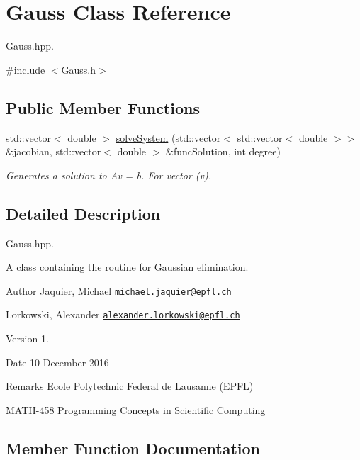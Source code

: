 \hypertarget{class_gauss}{}\section{Gauss Class Reference}
\label{class_gauss}


Gauss.\+hpp.  




{\ttfamily \#include $<$Gauss.\+h$>$}

\subsection*{Public Member Functions}
\begin{DoxyCompactItemize}
\item 
std\+::vector$<$ double $>$ \hyperlink{class_gauss_a47211d56c21c8279ca1349dccb03d77e}{solve\+System} (std\+::vector$<$ std\+::vector$<$ double $>$$>$ \&jacobian, std\+::vector$<$ double $>$ \&func\+Solution, int degree)
\begin{DoxyCompactList}\small\item\em Generates a solution to Av = b. For vector (v). \end{DoxyCompactList}\end{DoxyCompactItemize}


\subsection{Detailed Description}
Gauss.\+hpp. 

A class containing the routine for Gaussian elimination. \begin{DoxyAuthor}{Author}
Jaquier, Michael \href{mailto:michael.jaquier@epfl.ch}{\tt michael.\+jaquier@epfl.\+ch} 

Lorkowski, Alexander \href{mailto:alexander.lorkowski@epfl.ch}{\tt alexander.\+lorkowski@epfl.\+ch} 
\end{DoxyAuthor}
\begin{DoxyVersion}{Version}
1. 
\end{DoxyVersion}
\begin{DoxyDate}{Date}
10 December 2016 
\end{DoxyDate}
\begin{DoxyRemark}{Remarks}
Ecole Polytechnic Federal de Lausanne (E\+P\+FL) 

M\+A\+T\+H-\/458 Programming Concepts in Scientific Computing 
\end{DoxyRemark}


\subsection{Member Function Documentation}
